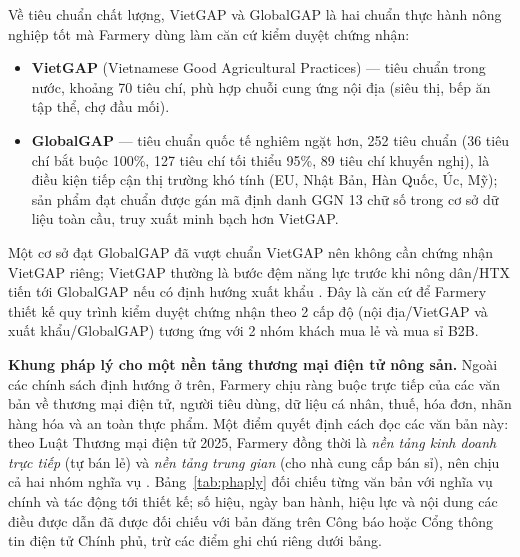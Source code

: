 Về tiêu chuẩn chất lượng, VietGAP và GlobalGAP là hai chuẩn thực hành nông nghiệp tốt mà Farmery dùng làm căn cứ kiểm duyệt chứng nhận:
\begin{itemize}
    \item \textbf{VietGAP} (Vietnamese Good Agricultural Practices) --- tiêu chuẩn trong nước, khoảng 70 tiêu chí, phù hợp chuỗi cung ứng nội địa (siêu thị, bếp ăn tập thể, chợ đầu mối).
    \item \textbf{GlobalGAP} --- tiêu chuẩn quốc tế nghiêm ngặt hơn, 252 tiêu chuẩn (36 tiêu chí bắt buộc 100\%, 127 tiêu chí tối thiểu 95\%, 89 tiêu chí khuyến nghị), là điều kiện tiếp cận thị trường khó tính (EU, Nhật Bản, Hàn Quốc, Úc, Mỹ); sản phẩm đạt chuẩn được gán mã định danh GGN 13 chữ số trong cơ sở dữ liệu toàn cầu, truy xuất minh bạch hơn VietGAP.
\end{itemize}
Một cơ sở đạt GlobalGAP đã vượt chuẩn VietGAP nên không cần chứng nhận VietGAP riêng; VietGAP thường là bước đệm năng lực trước khi nông dân/HTX tiến tới GlobalGAP nếu có định hướng xuất khẩu \parencite{vietgap_globalgap}. Đây là căn cứ để Farmery thiết kế quy trình kiểm duyệt chứng nhận theo 2 cấp độ (nội địa/VietGAP và xuất khẩu/GlobalGAP) tương ứng với 2 nhóm khách mua lẻ và mua sỉ B2B.

\noindent\textbf{Khung pháp lý cho một nền tảng thương mại điện tử nông sản.} Ngoài các chính sách định hướng ở trên, Farmery chịu ràng buộc trực tiếp của các văn bản về thương mại điện tử, người tiêu dùng, dữ liệu cá nhân, thuế, hóa đơn, nhãn hàng hóa và an toàn thực phẩm. Một điểm quyết định cách đọc các văn bản này: theo Luật Thương mại điện tử 2025, Farmery đồng thời là \emph{nền tảng kinh doanh trực tiếp} (tự bán lẻ) và \emph{nền tảng trung gian} (cho nhà cung cấp bán sỉ), nên chịu cả hai nhóm nghĩa vụ \parencite{luattmdt2025}. Bảng~\ref{tab:phaply} đối chiếu từng văn bản với nghĩa vụ chính và tác động tới thiết kế; số hiệu, ngày ban hành, hiệu lực và nội dung các điều được dẫn đã được đối chiếu với bản đăng trên Công báo hoặc Cổng thông tin điện tử Chính phủ, trừ các điểm ghi chú riêng dưới bảng.

